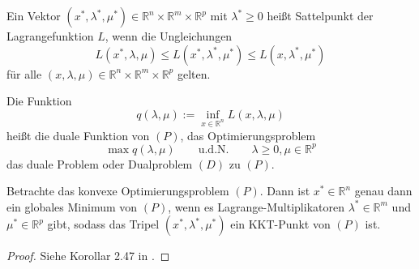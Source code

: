 \begin{definition}[Sattelpunkt]
	Ein Vektor $(x^*,\lambda^*,\mu^*) \in \mathbb{R}^n \times \mathbb{R}^m \times \mathbb{R}^p$ mit $\lambda^* \geq 0$ heißt Sattelpunkt der Lagrangefunktion $L$, wenn die Ungleichungen
	\begin{equation}
	L(x^*,\lambda,\mu) \leq L(x^*,\lambda^*,\mu^*) \leq L(x,\lambda^*,\mu^*)
	\end{equation}
	für alle $(x,\lambda,\mu) \in \mathbb{R}^n \times \mathbb{R}^m \times \mathbb{R}^p$ gelten.
\end{definition}

\begin{definition}
	Die Funktion 
	$$q(\lambda,\mu) := \inf_{x \in \mathbb{R}^n} L(x,\lambda,\mu)$$
	heißt die duale Funktion von $(P)$, das Optimierungsproblem $$
	\max{q(\lambda,\mu)} \qquad \text{u.d.N.} \qquad \lambda \geq 0, \mu \in \mathbb{R}^p$$
	das duale Problem oder Dualproblem $(D)$ zu $(P)$.
\end{definition}

\begin{satz}
	\label{dual-kkt}
	Betrachte das konvexe Optimierungsproblem $(P)$. Dann ist $x^* \in \mathbb{R}^n$ genau dann ein globales Minimum von $(P)$, wenn es Lagrange-Multiplikatoren $\lambda^* \in \mathbb{R}^m$ und $\mu^* \in \mathbb{R}^p$ gibt, sodass das Tripel $(x^*,\lambda^*,\mu^*)$ ein KKT-Punkt von $(P)$ ist.
\end{satz}
\begin{proof}
	Siehe Korollar 2.47 in \cite{gk-tnro}.
\end{proof}

